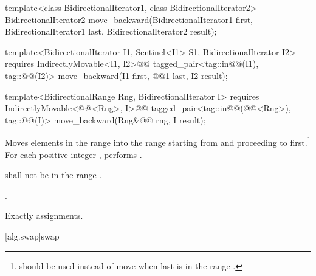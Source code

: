 %
\begin{removedblock}
\begin{itemdecl}
template<class BidirectionalIterator1, class BidirectionalIterator2>
  BidirectionalIterator2
    move_backward(BidirectionalIterator1 first,
                  BidirectionalIterator1 last,
                  BidirectionalIterator2 result);
\end{itemdecl}
\end{removedblock}
\begin{addedblock}
\begin{itemdecl}
template<BidirectionalIterator I1, Sentinel<I1> S1, BidirectionalIterator I2>
  requires IndirectlyMovable<I1, I2>@\newtxt{()}@
  tagged_pair<tag::in@@(I1), tag::@@(I2)>
    move_backward(I1 first, @@1 last, I2 result);

template<BidirectionalRange Rng, BidirectionalIterator I>
  requires IndirectlyMovable<@@<Rng>, I>@\newtxt{()}@
  tagged_pair<tag::in@@(@@<Rng>), tag::@@(I)>
    move_backward(Rng&@\newtxt{\&}@ rng, I result);
\end{itemdecl}
\end{addedblock}

\begin{itemdescr}
\pnum
\effects
Moves elements in the range 
into the
range 
starting from
and proceeding to first.\footnote{
should be used instead of move when last
is in
the range
.}
For each positive integer
,
performs
.

\pnum
\requires
{}
shall not be in the range
.

\pnum
\returns
{}.

\pnum
\complexity
Exactly
assignments.
\end{itemdescr}

[alg.swap]{swap}

